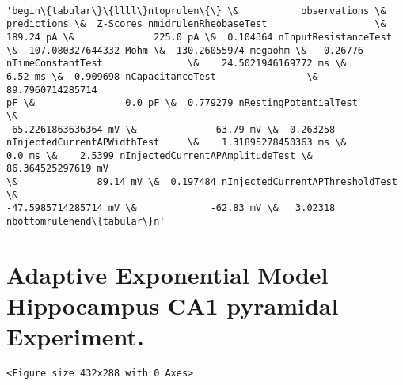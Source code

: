     \begin{center}
    \end{center}
    { \hspace*{\fill} \\}
    
            \begin{tcolorbox}[breakable, size=fbox, boxrule=.5pt, pad at break*=1mm, opacityfill=0]
\begin{Verbatim}[commandchars=\\\{\}]
'begin\{tabular\}\{llll\}ntoprulen\{\} \&           observations \&
predictions \&  Z-Scores nmidrulenRheobaseTest                   \&
189.24 pA \&              225.0 pA \&  0.104364 nInputResistanceTest
\&  107.080327644332 Mohm \&  130.26055974 megaohm \&   0.26776
nTimeConstantTest               \&    24.5021946169772 ms \&
6.52 ms \&  0.909698 nCapacitanceTest                \&    89.7960714285714
pF \&                0.0 pF \&  0.779279 nRestingPotentialTest           \&
-65.2261863636364 mV \&             -63.79 mV \&  0.263258
nInjectedCurrentAPWidthTest     \&    1.31895278450363 ms \&
0.0 ms \&    2.5399 nInjectedCurrentAPAmplitudeTest \&     86.364525297619 mV
\&              89.14 mV \&  0.197484 nInjectedCurrentAPThresholdTest \&
-47.5985714285714 mV \&             -62.83 mV \&   3.02318
nbottomrulenend\{tabular\}n'
\end{Verbatim}
\end{tcolorbox}
        
    \hypertarget{adaptive-exponential-model-hippocampus-ca1-pyramidal-experiment.}{%
\section{Adaptive Exponential Model Hippocampus CA1 pyramidal
Experiment.}\label{adaptive-exponential-model-hippocampus-ca1-pyramidal-experiment.}}

    
    \begin{verbatim}
<Figure size 432x288 with 0 Axes>
    \end{verbatim}

    
    \begin{center}
    \end{center}
    { \hspace*{\fill} \\}
    
